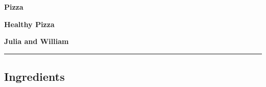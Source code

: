 \documentclass[
  10pt,
  a5paper,
  onecolumn,
  twoside]{article}
\author{}
\date{\vspace{-2.5em}}
\begin{document}
\renewcommand{\maketitle}{
  \thispagestyle{firstpage}  
    \begin{center}
      \Huge
      \textbf{Pizza}
      \par
      \vspace{0.50cm}
      \large
      \textbf{Healthy Pizza}
      \par
      \vspace{0.20cm}
      \small
      \textbf{Julia and William}
      \par
      \vspace{0cm}
      \rule{0.4\textwidth}{0.5pt}
    \end{center}
}

\newpage

  \thispagestyle{firstpage}  
    \begin{center}
      \Huge
      \textbf{Pizza}
      \par
      \vspace{0.50cm}
      \large
      \textbf{Healthy Pizza}
      \par
      \vspace{0.20cm}
      \small
      \textbf{Julia and William}
      \par
      \vspace{0cm}
      \rule{0.4\textwidth}{0.5pt}
    \end{center}

\chead[]{}
\lfoot[\thepage]{}
\cfoot[]{}
\rfoot[]{\thepage}

\hypertarget{ingredients}{%
\subsection{Ingredients}\label{ingredients}}
\end{document}
